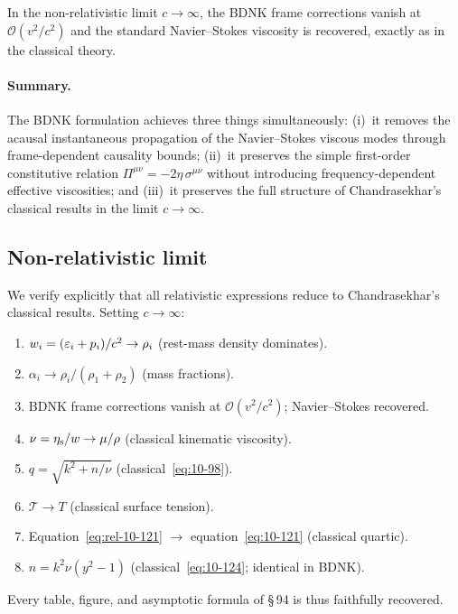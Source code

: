 In the non-relativistic limit $c \to \infty$, the BDNK frame
corrections vanish at $\mathcal{O}(v^2/c^2)$ and the standard
Navier--Stokes viscosity is recovered, exactly as in the classical
theory.

\paragraph{Summary.}
The BDNK formulation achieves three things simultaneously:
(i)~it removes the acausal instantaneous propagation of the
Navier--Stokes viscous modes through frame-dependent causality
bounds; (ii)~it preserves the simple first-order constitutive
relation $\Pi^{\mu\nu} = -2\eta\,\sigma^{\mu\nu}$ without
introducing frequency-dependent effective viscosities; and
(iii)~it preserves the full structure of Chandrasekhar's classical
results in the limit $c \to \infty$.

\subsection{Non-relativistic limit}
\label{sec:rel-10-94-NR}

We verify explicitly that all relativistic expressions reduce to
Chandrasekhar's classical results.  Setting
$c \to \infty$:
\begin{enumerate}
  \item $w_{i} = (\varepsilon_{i}+p_{i})/c^{2}
    \to \rho_{i}$ (rest-mass density dominates).
  \item $\alpha_{i} \to \rho_{i}/(\rho_{1}+\rho_{2})$
    (mass fractions).
  \item BDNK frame corrections vanish at $\mathcal{O}(v^2/c^2)$;
    Navier--Stokes recovered.
  \item $\nu = \eta_{\mathrm{s}}/w \to \mu/\rho$
    (classical kinematic viscosity).
  \item $q = \sqrt{k^{2}+n/\nu}$
    (classical~\eqref{eq:10-98}).
  \item $\mathcal{T} \to T$ (classical surface tension).
  \item Equation~\eqref{eq:rel-10-121} $\to$
    equation~\eqref{eq:10-121} (classical quartic).
  \item $n = k^{2}\nu(y^{2}-1)$
    (classical~\eqref{eq:10-124}; identical in BDNK).
\end{enumerate}
Every table, figure, and asymptotic formula of \S\,94 is thus
faithfully recovered.

